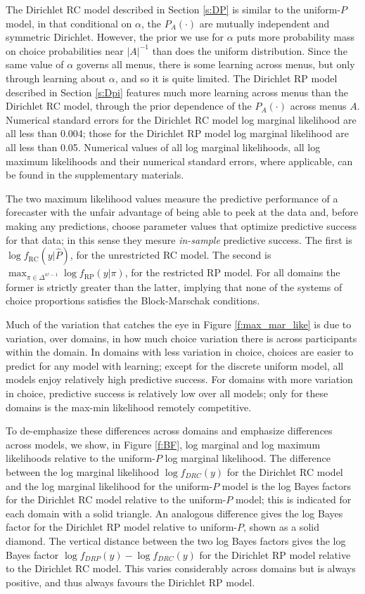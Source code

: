 \documentclass[11pt,letter]{article}
\newcommand{\Dpi}{Dirichlet RP model}
\newcommand{\DP}{Dirichlet RC model}
\begin{document}
The \DP{} described in Section \ref{s:DP} is similar to the uniform-$P$ model, in that conditional on $\alpha$, the $P_A(\cdot)$ are mutually independent and symmetric Dirichlet.
However, the prior we use for $\alpha$ puts more probability mass on choice probabilities near $|A|^{-1}$ than does the uniform distribution.
Since the same value of $\alpha$ governs all menus, there is some learning across menus, but only through learning about $\alpha$, and so it is quite limited.
The \Dpi{} described in Section \ref{s:Dpi} features much more learning across menus than the \DP{}, through the prior dependence of the $P_A(\cdot)$ across menus $A$.
Numerical standard errors for the \DP{} log marginal likelihood are all less than 0.004; those for the \Dpi{} log marginal likelihood are all less than 0.05.
Numerical values of all log marginal likelihoods, all log maximum likelihoods and their numerical standard errors, where applicable, can be found in the supplementary materials.

The two maximum likelihood values measure the predictive performance of a forecaster with the unfair advantage of being able to peek at the data and, before making any predictions, choose parameter values that optimize predictive success for that data; in this sense they mesure {\em in-sample} predictive success.
The first is $\log f_\mathrm{RC}(y|\hat{P})$, for the unrestricted RC model.
The second is $\max_{\pi \in \Delta^{n!-1}} \log f_\mathrm{RP}(y|\pi)$, for the restricted RP model.
For all domains the former is strictly greater than the latter, implying that none of the systems of choice proportions satisfies the Block-Marschak conditions.

Much of the variation that catches the eye in Figure \ref{f:max_mar_like} is due to variation, over domains, in how much choice variation there is across participants within the domain.
In domains with less variation in choice, choices are easier to predict for any model with learning; except for the discrete uniform model, all models enjoy relatively high predictive success.
For domains with more variation in choice, predictive success is relatively low over all models; only for these domains is the max-min likelihood remotely competitive.

To de-emphasize these differences across domains and emphasize differences across models, we show, in Figure \ref{f:BF}, log marginal and log maximum likelihoods relative to the uniform-$P$ log marginal likelihood.
The difference between the log marginal likelihood $\log f_{DRC}(y)$ for the \DP{} and the log marginal likelihood for the uniform-$P$ model is the log Bayes factors for the \DP{} relative to the uniform-$P$ model; this is indicated for each domain with a solid triangle.
An analogous difference gives the log Bayes factor for the \Dpi{} relative to uniform-$P$, shown as a solid diamond.
The vertical distance between the two log Bayes factors gives the log Bayes factor $\log f_{DRP}(y) - \log f_{DRC}(y)$ for the \Dpi{} relative to the \DP{}.
This varies considerably across domains but is always positive, and thus always favours the \Dpi{}.
\end{document}
